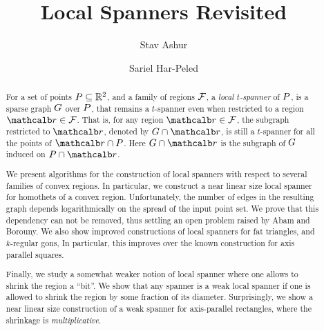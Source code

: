 \documentclass[12pt]{article}%
\begin{document}
\title{Local Spanners Revisited}

\author{%
   Stav Ashur%
   \StavThanks{}%
   \and%
   Sariel Har-Peled%
}%

\maketitle



\begin{abstract}
    For a set of points $P \subseteq \mathbb{R}^2$, and a family of regions
    $\mathcal{F}$, a \emph{local $t$-spanner} of $P$, is a sparse graph $G$
    over $P$, that remains a $t$-spanner even when restricted to a
    region $\region \in \FF$. That is, for any region
    $\region \in \FF$, the subgraph restricted to $\region$, denoted
    by $\restrictY{\G}{\region}$, is still a $t$-spanner for all the
    points of $\region \cap \PS$. Here $\restrictY{\G}{\region}$ is
    the subgraph of $G$ induced on $\PS \cap \region$.

    We present algorithms for the construction of local spanners with
    respect to several families of convex regions. In particular, we
    construct a near linear size local spanner for homothets of a
    convex region. Unfortunately, the number of edges in the resulting
    graph depends logarithmically on the spread of the input point
    set. We prove that this dependency can not be removed, thus
    settling an open problem raised by Abam and Borouny.  We also show
    improved constructions of local spanners for fat triangles, and
    $k$-regular gons, In particular, this improves over the known
    construction for axis parallel squares.

    Finally, we study a somewhat weaker notion of local spanner where
    one allows to shrink the region a ``bit''. We show that any spanner is
    a weak local spanner if one is allowed to shrink the region by
    some fraction of its diameter. Surprisingly, we show a near linear
    size construction of a weak spanner for axis-parallel rectangles,
    where the shrinkage is \emph{multiplicative}.

\end{abstract}
\end{document}
